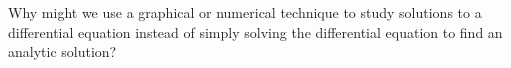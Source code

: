 Why might we use a graphical or numerical technique to study solutions to a differential equation instead of simply solving the differential equation to find an analytic solution?
